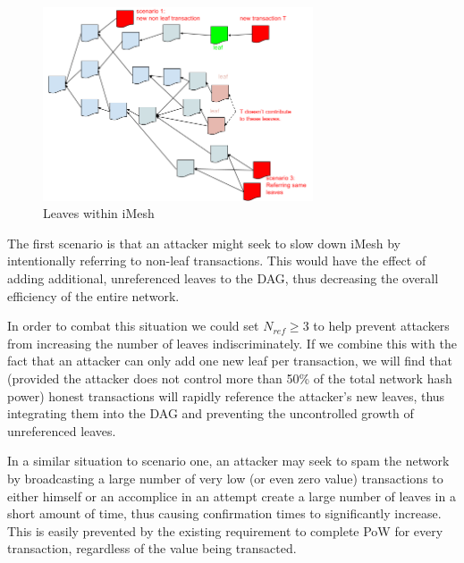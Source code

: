 \documentclass[a4paper,10pt,twocolumn]{article}
\begin{document}
	\begin{figure}[ht]
		\begin{center}
		\includegraphics[width=80mm]{leaves.png}
		  \caption{Leaves within iMesh}
		\label{fig:leaves}
		\end{center}
	 \end{figure}
	
	\vspace{-3.5mm}
	
	The first scenario is that an attacker might seek to slow down iMesh by intentionally referring to non-leaf transactions.
	This would have the effect of adding additional, unreferenced leaves to the DAG, thus decreasing the overall efficiency of the entire network.
	
	\vspace{2.5mm}
	
	In order to combat this situation we could set \( N_{ref} \geq 3 \) to help prevent attackers from increasing the number of leaves indiscriminately.
	If we combine this with the fact that an attacker can only add one new leaf per transaction, we will find that (provided the attacker does not control more than 50\% of the total network hash power) honest transactions will rapidly 
	reference the attacker's new leaves, thus integrating them into the DAG and preventing the uncontrolled growth of unreferenced leaves.
	
	\vspace{2.5mm}
	
	In a similar situation to scenario one, an attacker may seek to spam the network by broadcasting a large number of very low (or even zero value) transactions to either himself or an accomplice in an attempt create a large number of leaves in a short 
	amount of time, thus causing confirmation times to significantly increase. This is easily prevented by the existing requirement to complete PoW for every transaction, regardless of the value being transacted.
	
\end{document}
